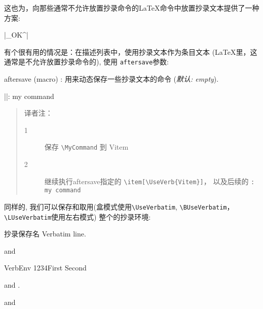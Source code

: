 \documentclass[twoside]{article}
\newcommand\cs[1]{\texttt{\textbackslash#1}}
\providecommand\optname[1]{\textsf{#1}}
\newenvironment{optlist}{\begin{description}%
  \renewcommand\makelabel[1]{%
    \descriptionlabel{\mdseries\optname{##1}}}%
  \itemsep0.25\itemsep}%
 {\end{description}}
\begin{document}
  这也为，向那些通常不允许放置抄录命令的\LaTeX{}命令中放置抄录文本提供了一种方案: %

{
\begin{Example}
  \DefineShortVerb{\|}|_OK^| 
\end{Example}
}

  有个很有用的情况是：在描述列表中，使用抄录文本作为条目文本
 (\LaTeX 里，这通常是不允许放置抄录命令的), 使用
\texttt{aftersave}参数:

\begin{optlist}
  \item[aftersave (macro)]: 用来动态保存一些抄录文本的命令
  (\emph{默认: empty}).
\end{optlist}

\begin{SideBySideExample}
  \newcommand{\Vitem}{%
    }
  \DefineShortVerb{\|}
  \begin{description}
    \Vitem|\MyCommand|: my command
  \end{description}
\end{SideBySideExample}

\begin{quotation}
译者注：
\begin{description}
  \item[1] 保存 \verb|\MyCommand| 到 Vitem
  \item[2] 继续执行aftersave指定的 \verb|\item[\UseVerb{Vitem}]|， 以及后续的 \verb|: my command|
\end{description}
\end{quotation}

  同样的, 我们可以保存和取用(盒模式使用\cs{UseVerbatim}, \cs{BUseVerbatim}，\cs{LUseVerbatim}使用左右模式)
整个的抄录环境:

\begin{SideBySideExample}
  \begin{SaveVerbatim}{抄录保存名}
    Verbatim line.
  \end{SaveVerbatim}
  and 
\end{SideBySideExample}

\begin{SideBySideExample}
  \begin{SaveVerbatim}[gobble=5]%
    {VerbEnv}
1234First
    Second
  \end{SaveVerbatim}

  and .

   and
\end{SideBySideExample}
\end{document}
